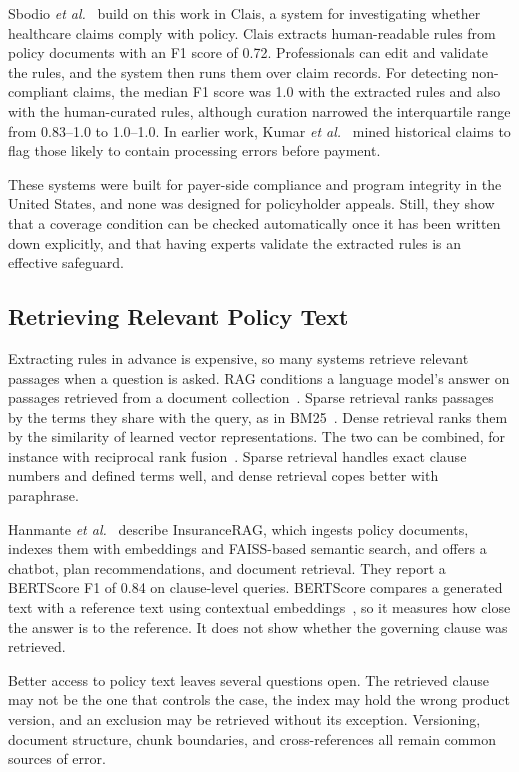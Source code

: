 \documentclass[conference]{IEEEtran}
\begin{document}
Sbodio \textit{et al.}~\cite{sbodio2024} build on this work in Clais, a system for investigating whether healthcare claims comply with policy. Clais extracts human-readable rules from policy documents with an F1 score of 0.72. Professionals can edit and validate the rules, and the system then runs them over claim records. For detecting non-compliant claims, the median F1 score was 1.0 with the extracted rules and also with the human-curated rules, although curation narrowed the interquartile range from 0.83--1.0 to 1.0--1.0. In earlier work, Kumar \textit{et al.}~\cite{kumar2010} mined historical claims to flag those likely to contain processing errors before payment.

These systems were built for payer-side compliance and program integrity in the United States, and none was designed for policyholder appeals. Still, they show that a coverage condition can be checked automatically once it has been written down explicitly, and that having experts validate the extracted rules is an effective safeguard.

\subsection{Retrieving Relevant Policy Text}
Extracting rules in advance is expensive, so many systems retrieve relevant passages when a question is asked. RAG conditions a language model's answer on passages retrieved from a document collection~\cite{lewis2020}. Sparse retrieval ranks passages by the terms they share with the query, as in BM25~\cite{robertson2009}. Dense retrieval ranks them by the similarity of learned vector representations. The two can be combined, for instance with reciprocal rank fusion~\cite{cormack2009}. Sparse retrieval handles exact clause numbers and defined terms well, and dense retrieval copes better with paraphrase.

Hanmante \textit{et al.}~\cite{hanmante2026} describe InsuranceRAG, which ingests policy documents, indexes them with embeddings and FAISS-based semantic search, and offers a chatbot, plan recommendations, and document retrieval. They report a BERTScore F1 of 0.84 on clause-level queries. BERTScore compares a generated text with a reference text using contextual embeddings~\cite{zhang2020}, so it measures how close the answer is to the reference. It does not show whether the governing clause was retrieved.

Better access to policy text leaves several questions open. The retrieved clause may not be the one that controls the case, the index may hold the wrong product version, and an exclusion may be retrieved without its exception. Versioning, document structure, chunk boundaries, and cross-references all remain common sources of error.
\end{document}
